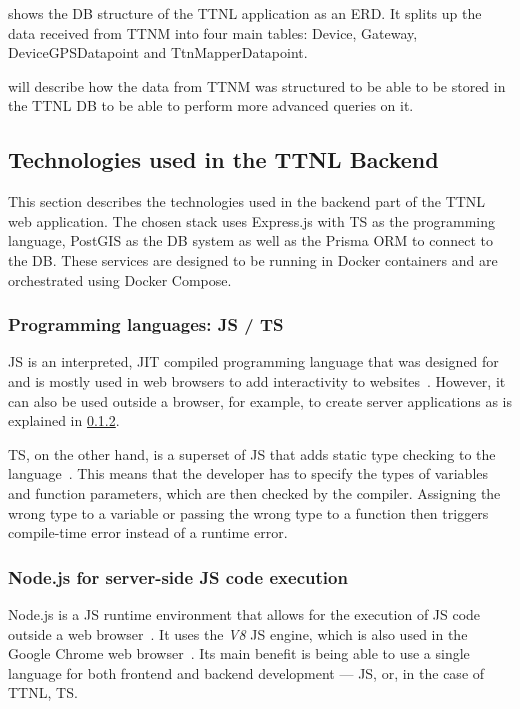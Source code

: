 shows the \ac{DB} structure of the \ac{TTNL} application as an \ac{ERD}.
It splits up the data received from \ac{TTNM} into four main tables: Device, Gateway, DeviceGPSDatapoint and TtnMapperDatapoint.

 will describe how the data from \ac{TTNM} was structured to be able to be stored in the \ac{TTNL} \ac{DB} to be able to perform more advanced queries on it.

\subsection{Technologies used in the \acl{TTNL} Backend}

This section describes the technologies used in the backend part of the \ac{TTNL} web application.
The chosen stack uses Express.js with \ac{TS} as the programming language, PostGIS as the \ac{DB} system as well as the Prisma \ac{ORM} to connect to the \ac{DB}.
These services are designed to be running in Docker containers and are orchestrated using Docker Compose.

\subsubsection{Programming languages: \acl{JS} / \acl{TS}}

\ac{JS} is an interpreted, \ac{JIT} compiled programming language that was designed for and is mostly used in web browsers to add interactivity to websites~\cite{mdn_javascript_2023}.
However, it can also be used outside a browser, for example, to create server applications as is explained in \cref{sec:nodejs}.

\ac{TS}, on the other hand, is a superset of \ac{JS} that adds static type checking to the language~\cite{microsoft_javascript_nodate}.
This means that the developer has to specify the types of variables and function parameters, which are then checked by the compiler.
Assigning the wrong type to a variable or passing the wrong type to a function then triggers compile-time error instead of a runtime error.

\subsubsection{Node.js for server-side \acl{JS} code execution}\label{sec:nodejs}

Node.js is a \ac{JS} runtime environment that allows for the execution of \ac{JS} code outside a web browser~\cite{openjs_foundation_nodejs_nodate}.
It uses the \emph{V8} \ac{JS} engine, which is also used in the Google Chrome web browser~\cite{google_llc_v8_nodate}.
Its main benefit is being able to use a single language for both frontend and backend development --- \ac{JS}, or, in the case of \ac{TTNL}, \ac{TS}.

